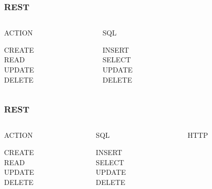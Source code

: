 \begin{frame}
  \frametitle{REST}
  \begin{columns}
    \begin{column}{2cm}
      \begin{center}ACTION\end{center}
      CREATE\\
      READ\\
      UPDATE\\
      DELETE
    \end{column}    
    \begin{column}{2cm}
      \begin{center}SQL\end{center}
      INSERT\\
      SELECT\\
      UPDATE\\
      DELETE
    \end{column}
    \begin{column}{2cm}      
    \end{column}
  \end{columns}
\end{frame}

\begin{frame}
  \frametitle{REST}
  \begin{columns}
    \begin{column}{2cm}
      \begin{center}ACTION\end{center}
      CREATE\\
      READ\\
      UPDATE\\
      DELETE
    \end{column}    
    \begin{column}{2cm}
      \begin{center}SQL\end{center}
      INSERT\\
      SELECT\\
      UPDATE\\
      DELETE
    \end{column}
    \begin{column}{2cm}   
      \begin{center}HTTP\end{center}
      \\
      \\
      \\
    \end{column}
  \end{columns}
\end{frame}

